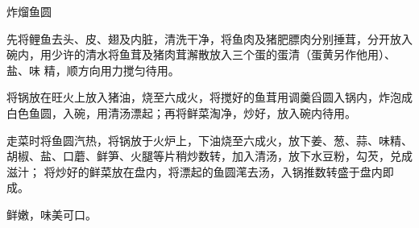 %
%
%
%
%
%
%
\begin{recipe}{炸熘鱼圆}

\ingredients


\preparation

\step 先将鲤鱼去头、皮、翅及内脏，清洗干净，将鱼肉及猪肥膘肉分别捶茸，分开放入
碗内，用少许的清水将鱼茸及猪肉茸澥散放入三个蛋的蛋清（蛋黄另作他用）、盐、味
精，顺方向用力搅匀待用。

\step 将锅放在旺火上放入猪油，烧至六成火，将搅好的鱼茸用调羹舀圆入锅内，炸泡成
白色鱼圆，入碗，用清汤漂起；再将鲜菜淘净，炒好，放入碗内待用。

\step 走菜时将鱼圆汽热，将锅放于火炉上，下油烧至六成火，放下姜、葱、蒜、味精、
胡椒、盐、口蘑、鲜笋、火腿等片稍炒数转，加入清汤，放下水豆粉，勾芡，兑成滋汁；
将炒好的鲜菜放在盘内，将漂起的鱼圆滗去汤，入锅推数转盛于盘内即成。

\features

鲜嫩，味美可口。

\end{recipe}

